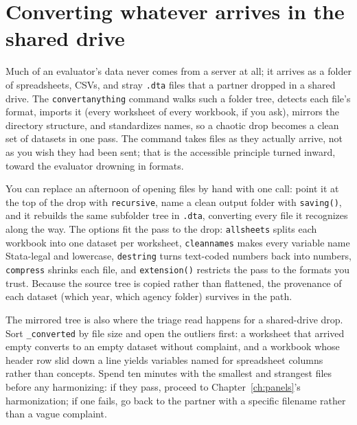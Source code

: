 \section{Converting whatever arrives in the shared drive}
Much of an evaluator's data never comes from a server at all; it arrives as a folder of spreadsheets, CSVs, and stray \texttt{.dta} files that a partner dropped in a shared drive. The \texttt{convertanything} command walks such a folder tree, detects each file's format, imports it (every worksheet of every workbook, if you ask), mirrors the directory structure, and standardizes names, so a chaotic drop becomes a clean set of datasets in one pass. The command takes files as they actually arrive, not as you wish they had been sent; that is the accessible principle turned inward, toward the evaluator drowning in formats.

You can replace an afternoon of opening files by hand with one call: point it at the top of the drop with \texttt{recursive}, name a clean output folder with \texttt{saving()}, and it rebuilds the same subfolder tree in \texttt{.dta}, converting every file it recognizes along the way. The options fit the pass to the drop: \texttt{allsheets} splits each workbook into one dataset per worksheet, \texttt{cleannames} makes every variable name Stata-legal and lowercase, \texttt{destring} turns text-coded numbers back into numbers, \texttt{compress} shrinks each file, and \texttt{extension()} restricts the pass to the formats you trust. Because the source tree is copied rather than flattened, the provenance of each dataset (which year, which agency folder) survives in the path.

The mirrored tree is also where the triage read happens for a shared-drive drop. Sort \texttt{\_converted} by file size and open the outliers first: a worksheet that arrived empty converts to an empty dataset without complaint, and a workbook whose header row slid down a line yields variables named for spreadsheet columns rather than concepts. Spend ten minutes with the smallest and strangest files before any harmonizing: if they pass, proceed to Chapter~\ref{ch:panels}'s harmonization; if one fails, go back to the partner with a specific filename rather than a vague complaint.

